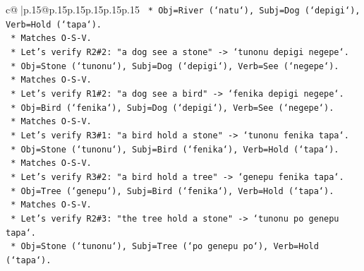 \documentclass{article}
\begin{document}
{\begin{supertabular}{c@{$\;$}|p{.15\linewidth}@{}p{.15\linewidth}p{.15\linewidth}p{.15\linewidth}p{.15\linewidth}p{.15\linewidth}}
{{{\texttt{                                                                    *   Obj=River (`natu`), Subj=Dog (`depigi`), Verb=Hold (`tapa`).} \\
\texttt{                                                                    *   Matches O{-}S{-}V.} \\
\texttt{                                                                *   Let's verify R2\#2: "a dog see a stone" {-}> `tunonu depigi negepe`.} \\
\texttt{                                                                    *   Obj=Stone (`tunonu`), Subj=Dog (`depigi`), Verb=See (`negepe`).} \\
\texttt{                                                                    *   Matches O{-}S{-}V.} \\
\texttt{                                                                *   Let's verify R1\#2: "a dog see a bird" {-}> `fenika depigi negepe`.} \\
\texttt{                                                                    *   Obj=Bird (`fenika`), Subj=Dog (`depigi`), Verb=See (`negepe`).} \\
\texttt{                                                                    *   Matches O{-}S{-}V.} \\
\texttt{                                                                *   Let's verify R3\#1: "a bird hold a stone" {-}> `tunonu fenika tapa`.} \\
\texttt{                                                                    *   Obj=Stone (`tunonu`), Subj=Bird (`fenika`), Verb=Hold (`tapa`).} \\
\texttt{                                                                    *   Matches O{-}S{-}V.} \\
\texttt{                                                                *   Let's verify R3\#2: "a bird hold a tree" {-}> `genepu fenika tapa`.} \\
\texttt{                                                                    *   Obj=Tree (`genepu`), Subj=Bird (`fenika`), Verb=Hold (`tapa`).} \\
\texttt{                                                                    *   Matches O{-}S{-}V.} \\
\texttt{                                                                *   Let's verify R2\#3: "the tree hold a stone" {-}> `tunonu po genepu tapa`.} \\
\texttt{                                                                    *   Obj=Stone (`tunonu`), Subj=Tree (`po genepu po`), Verb=Hold (`tapa`).} \\
}}}
\end{supertabular}}
\end{document}

